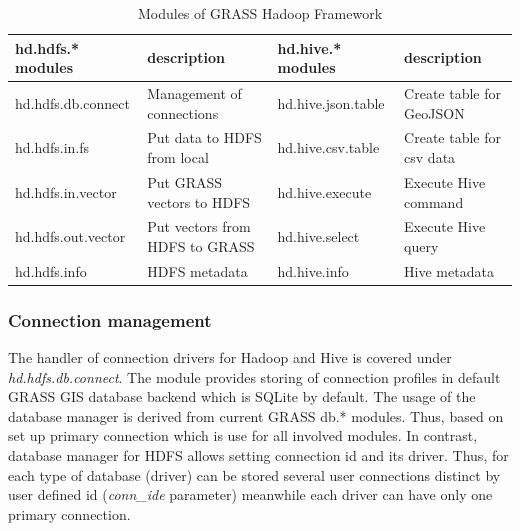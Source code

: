 \documentclass[a4paper,12pt,oneside]{report}
\begin{document}
	\begin{table}[!htbp]
		\centering
		\begin{scriptsize}
			\begin{tabular}{@{}|l|l||l|l|@{}}
				\toprule
				hd.hdfs.* modules  & description                    & hd.hive.* modules  & description
				\\ \midrule \midrule
				hd.hdfs.db.connect & Management of connections      & hd.hive.json.table & Create
				table for GeoJSON  \\ \midrule
				hd.hdfs.in.fs      & Put data to HDFS from local       & hd.hive.csv.table  & Create
				table for csv data \\ \midrule
				hd.hdfs.in.vector  & Put GRASS vectors to HDFS      & hd.hive.execute    & Execute
				Hive command      \\ \midrule
				hd.hdfs.out.vector & Put vectors from HDFS to GRASS & hd.hive.select     & Execute
				Hive query        \\ \midrule
				hd.hdfs.info       & HDFS metadata                  & hd.hive.info       & Hive
				metadata             \\ \bottomrule
			\end{tabular}%
		\end{scriptsize}
		\caption{Modules of GRASS Hadoop Framework}
		\label{tbl:modules}
	\end{table}
	
	
	
    \subsubsection{Connection management} 
    The handler of connection drivers for Hadoop and Hive is covered under
    \textit{hd.hdfs.db.connect}. The module provides storing of connection profiles in
    default GRASS GIS database backend which is SQLite  by default. The usage of 
    the database manager is derived from current GRASS db.* modules.
    Thus, based on set up primary connection which is use for all involved modules.
    In contrast, database manager for HDFS allows setting
    connection id and its driver. Thus, for each type of database (driver) can be
    stored several user connections distinct by user defined id (\textit{conn\_ide}
    parameter) meanwhile  each driver can have only one primary connection.
	
\end{document}
